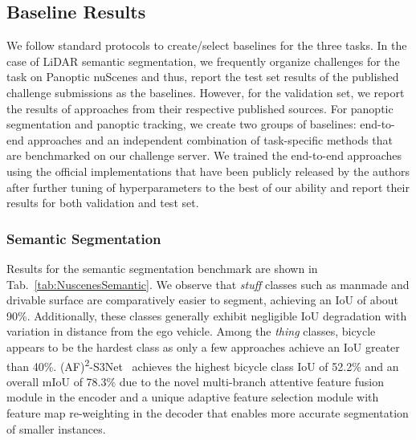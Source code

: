 \documentclass[letterpaper, 10 pt, journal, twoside]{IEEEtran}
\newcommand{\tabref}[1]{Tab.~\ref{#1}}
\begin{document}
\subsection{Baseline Results}
\label{subsec:baseline_results}

We follow standard protocols to create/select baselines for the three tasks. In the case of LiDAR semantic segmentation, we frequently organize challenges for the task on Panoptic nuScenes and thus, report the test set results of the published challenge submissions as the baselines. However, for the validation set, we report the results of approaches from their respective published sources. For panoptic segmentation and panoptic tracking, we create two groups of baselines: end-to-end approaches and an independent combination of task-specific methods that are benchmarked on our challenge server. We trained the end-to-end approaches using the official implementations that have been publicly released by the authors after further tuning of hyperparameters to the best of our ability and report their results for both validation and test set.

\subsubsection{Semantic Segmentation}

Results for the semantic segmentation benchmark are shown in \tabref{tab:NuscenesSemantic}. We observe that \emph{stuff} classes such as manmade and drivable surface are comparatively easier to segment, achieving an IoU of about 90\%. Additionally, these classes generally exhibit negligible IoU degradation with variation in distance from the ego vehicle. Among the \emph{thing} classes, bicycle appears to be the hardest class as only a few approaches achieve an IoU greater than 40\%. (AF)\textsuperscript{2}-S3Net~\cite{cheng20212} achieves the highest bicycle class IoU of 52.2\% and an overall mIoU of 78.3\% due to the novel multi-branch attentive feature fusion module in the encoder and a unique adaptive feature selection module with feature map re-weighting in the decoder that enables more accurate segmentation of smaller instances.
\end{document}
